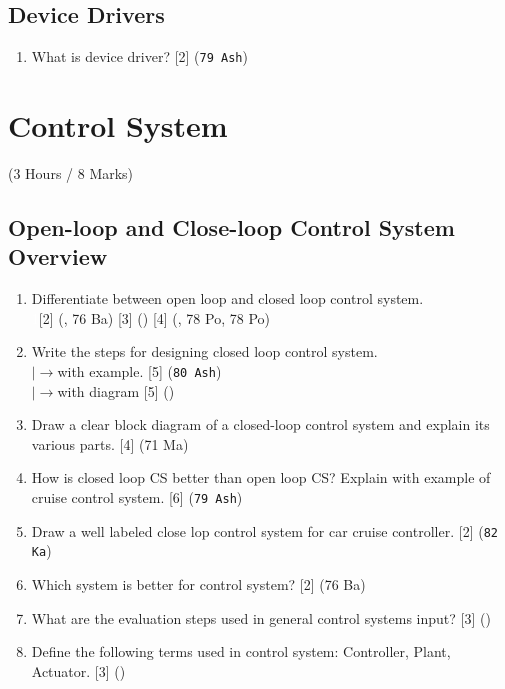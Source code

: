 \documentclass[12pt]{article}
\newcommand{\lb}{\\$\left|\rightarrow\right.$}
\newcommand{\enter}{\\\textcolor{white}{1}}
\begin{document}
  \subsection{Device Drivers}
    \begin{enumerate}
      \item What is device driver? \hfill [2] (\texttt{79 Ash})
    \end{enumerate}

\pagebreak

\section{Control System}
  \begin{center}(3 Hours / 8 Marks)\end{center}
  
  \subsection{Open-loop and Close-loop Control System Overview}
    \begin{enumerate}
      \item Differentiate between open loop and closed loop control system.
        \enter\hfill [2] (, 76 Ba) [3] () [4] (, 78 Po, 78 Po)

      \item Write the steps for designing closed loop control system.
        \lb with example. \hfill [5] (\texttt{80 Ash})
        \lb with diagram \hfill [5] ()

      \item Draw a clear block diagram of a closed-loop control system and explain its various parts. \hfill [4] (71 Ma)

      \item How is closed loop CS better than open loop CS? Explain with example of cruise control system. \hfill [6] (\texttt{79 Ash})

      \item Draw a well labeled close lop control system for car cruise controller. \hfill [2] (\texttt{82 Ka})

      \item Which system is better for control system? \hfill [2] (76 Ba)

      \item What are the evaluation steps used in general control systems input? \hfill [3] ()

      \item Define the following terms used in control system: Controller, Plant, Actuator. \hfill [3] ()
    \end{enumerate}
\end{document}
